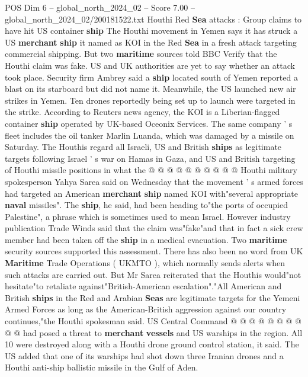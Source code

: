 \begin{textsample}{POS Dim 6 – global\_north\_2024\_02 – Score 7.00 – global\_north\_2024\_02/200181522.txt}  \label{ex:f6_pos_195}
Houthi Red \textbf{Sea} attacks : Group claims to have hit US container \textbf{ship} The Houthi movement in Yemen says it has struck a US \textbf{merchant} \textbf{ship} it named as KOI in the Red \textbf{Sea} in a fresh attack targeting commercial shipping.
But two \textbf{maritime} sources told BBC Verify that the Houthi claim was fake.
US and UK authorities are yet to say whether an attack took place.
Security firm Ambrey said a \textbf{ship} located south of Yemen reported a blast on its starboard but did not name it.
Meanwhile, the US launched new air strikes in Yemen.
Ten drones reportedly being set up to launch were targeted in the strike.
According to Reuters news agency, the KOI is a Liberian-flagged container \textbf{ship} operated by UK-based Oceonix Services.
The same company ' s fleet includes the oil tanker Marlin Luanda, which was damaged by a missile on Saturday.
The Houthis regard all Israeli, US and British \textbf{ships} as legitimate targets following Israel ' s war on Hamas in Gaza, and US and British targeting of Houthi missile positions in what the @ @ @ @ @ @ @ @ @ @ Houthi military spokesperson Yahya Sarea said on Wednesday that the movement ' s armed forces had targeted an American \textbf{merchant} \textbf{ship} named KOI with"several appropriate \textbf{naval} missiles".
The \textbf{ship}, he said, had been heading to"the ports of occupied Palestine", a phrase which is sometimes used to mean Israel.
However industry publication Trade Winds said that the claim was"fake"and that in fact a sick crew member had been taken off the \textbf{ship} in a medical evacuation.
Two \textbf{maritime} security sources supported this assessment.
There has also been no word from UK \textbf{Maritime} Trade Operations ( UKMTO ), which normally sends alerts when such attacks are carried out.
But Mr Sarea reiterated that the Houthis would"not hesitate"to retaliate against"British-American escalation"."All American and British \textbf{ships} in the Red and Arabian \textbf{Seas} are legitimate targets for the Yemeni Armed Forces as long as the American-British aggression against our country continues,"the Houthi spokesman said.
US Central Command @ @ @ @ @ @ @ @ @ @ had posed a threat to \textbf{merchant} \textbf{vessels} and US warships in the region.
All 10 were destroyed along with a Houthi drone ground control station, it said.
The US added that one of its warships had shot down three Iranian drones and a Houthi anti-ship ballistic missile in the Gulf of Aden.

\end{textsample}
